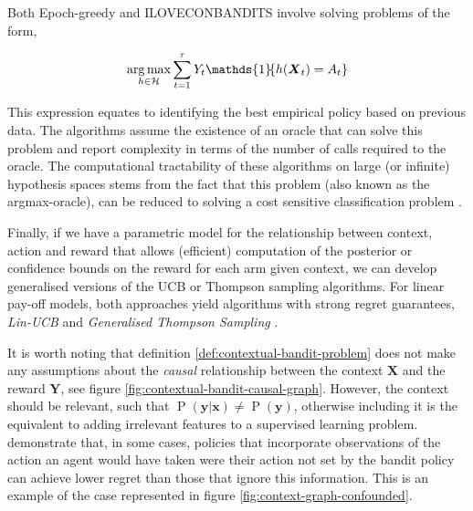 \documentclass[11pt,a4paper,oneside]{book}
\newcommand{\set}[1]{\left\{#1\right\}}
\newcommand{\ind}[1]{\mathds{1}\!\!\set{#1}}
\newcommand{\argmax}{\operatornamewithlimits{arg\,max}}
\newcommand{\eqn}[1]{\begin{align}#1\end{align}}
\renewcommand{\P}[1]{\operatorname{P}\left(#1\right)}
\renewcommand{\vec}[1]{\boldsymbol{#1}}
\theoremstyle{plain}
\theoremstyle{definition}
\begin{document}
Both Epoch-greedy and ILOVECONBANDITS involve solving problems of the form,

\eqn{
\argmax_{h \in \mathcal{H}} \sum_{t=1}^\tau Y_t \ind{h(\vec{X}_t) = A_t}
}

This expression equates to identifying the best empirical policy based on previous data. The algorithms assume the existence of an oracle that can solve this problem and report complexity in terms of the number of calls required to the oracle. The computational tractability of these algorithms on large (or infinite) hypothesis spaces stems from the fact that this problem (also known as the argmax-oracle), can be reduced to solving a cost sensitive classification problem \citep{Dudik2011a}. 

Finally, if we have a parametric model for the relationship between context, action and reward that allows (efficient) computation of the posterior or confidence bounds on the reward for each arm given context, we can develop generalised versions of the UCB or Thompson sampling algorithms. For linear pay-off models, both approaches yield algorithms with strong regret guarantees, \emph{Lin-UCB} \citep{li2010contextual} and \emph{Generalised Thompson Sampling} \citep{Agrawal2013}. 

It is worth noting that definition \ref{def:contextual-bandit-problem} does not make any assumptions about the \emph{causal} relationship between the context $\vec{X}$ and the reward $\vec{Y}$, see figure \ref{fig:contextual-bandit-causal-graph}. However, the context should be relevant, such that $\P{\vec{y}|\vec{x}} \neq \P{\vec{y}}$, otherwise including it is the equivalent to adding irrelevant features to a supervised learning problem. \citet{Bareinboim2015} demonstrate that, in some cases, policies that incorporate observations of the action an agent would have taken were their action not set by the bandit policy can achieve lower regret than those that ignore this information. This is an example of the case represented in figure \ref{fig:context-graph-confounded}.  
\end{document}
